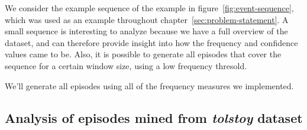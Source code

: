 We consider the example sequence of the example in figure~\ref{fig:event-sequence}, which was used as an example throughout chapter~\ref{sec:problem-statement}. A small sequence is interesting to analyze because we have a full overview of the dataset, and can therefore provide insight into how the frequency and confidence values came to be. Also, it is possible to generate all episodes that cover the sequence for a certain window size, using a low frequency thresold.

We'll generate all episodes using all of the frequency measures we implemented.
\fi


\subsection{Analysis of episodes mined from \emph{tolstoy} dataset}

